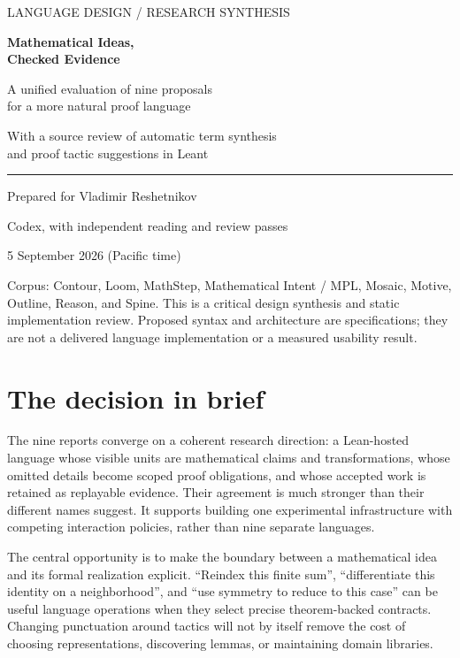 \documentclass[11pt,letterpaper]{article}
\begin{document}
\begin{titlepage}
\color{ink}
{\sffamily\large LANGUAGE DESIGN / RESEARCH SYNTHESIS\par}
\vspace{1.2in}
{\sffamily\bfseries\fontsize{32}{37}\selectfont Mathematical Ideas,\\Checked Evidence\par}
\vspace{.35in}
{\sffamily\Large A unified evaluation of nine proposals\\for a more natural proof language\par}
\vspace{.5in}
{\large With a source review of automatic term synthesis\\and proof tactic suggestions in Leant\par}
\vfill
\rule{\textwidth}{1pt}
\vspace{.18in}
Prepared for Vladimir Reshetnikov\par
Codex, with independent reading and review passes\par
5 September 2026 (Pacific time)\par
\vspace{.3in}
\small
Corpus: Contour, Loom, MathStep, Mathematical Intent / MPL, Mosaic, Motive,
Outline, Reason, and Spine. This is a critical design synthesis and static
implementation review. Proposed syntax and architecture are specifications;
they are not a delivered language implementation or a measured usability result.
\end{titlepage}

\section*{The decision in brief}
The nine reports converge on a coherent research direction: a Lean-hosted language
whose visible units are mathematical claims and transformations, whose omitted
details become scoped proof obligations, and whose accepted work is retained as
replayable evidence. Their agreement is much stronger than their different names
suggest. It supports building one experimental infrastructure with competing
interaction policies, rather than nine separate languages.

The central opportunity is to make the boundary between a mathematical idea and
its formal realization explicit. ``Reindex this finite sum'', ``differentiate this
identity on a neighborhood'', and ``use symmetry to reduce to this case'' can be
useful language operations when they select precise theorem-backed contracts.
Changing punctuation around tactics will not by itself remove the cost of choosing
representations, discovering lemmas, or maintaining domain libraries.
\end{document}
